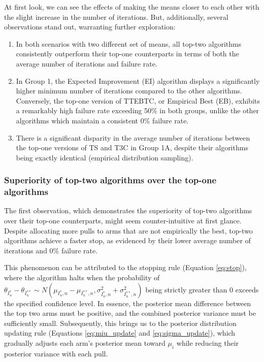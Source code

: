 \documentclass[a4paper, 12pt]{article}
\theoremstyle{definition}
\begin{document}
At first look, we can see the effects of making the means closer to each other with the slight increase in the number of iterations. But, additionally, several observations stand out, warranting further exploration:

\begin{enumerate}
\item In both scenarios with two different set of means, all top-two algorithms consistently outperform their top-one counterparts in terms of both the average number of iterations and failure rate.
\item In Group 1, the Expected Improvement (EI) algorithm displays a significantly higher minimum number of iterations compared to the other algorithms. Conversely, the top-one version of TTEBTC, or Empirical Best (EB), exhibits a remarkably high failure rate exceeding 50\% in both groups, unlike the other algorithms which maintain a consistent 0\% failure rate.
\item There is a significant disparity in the average number of iterations between the top-one versions of TS and T3C in Group 1A, despite their algorithms being exactly identical (empirical distribution sampling).
\end{enumerate}

\subsubsection{Superiority of top-two algorithms over the top-one algorithms}
The first observation, which demonstrates the superiority of top-two algorithms over their top-one counterparts, might seem counter-intuitive at first glance. Despite allocating more pulls to arms that are not empirically the best, top-two algorithms achieve a faster stop, as evidenced by their lower average number of iterations and 0\% failure rate.

This phenomenon can be attributed to the stopping rule (Equation \ref{eq:stop}), where the algorithm halts when the probability of $\theta_{I_n^*}-\theta_{I_n^{**}} \sim N\left(\mu_{{I_n^*},n} - \mu_{{I_n^{**}},n},\sigma_{{I_n^*},n}^2 + \sigma_{{I_n^{**}},n}^2\right)$ being strictly greater than 0 exceeds the specified confidence level. In essence, the posterior mean difference between the top two arms must be positive, and the combined posterior variance must be sufficiently small. Subsequently, this brings us to the posterior distribution updating rule (Equations \ref{eq:miu_update} and \ref{eq:sigma_update}), which gradually adjusts each arm's posterior mean toward $\mu_i$ while reducing their posterior variance with each pull.
\end{document}
